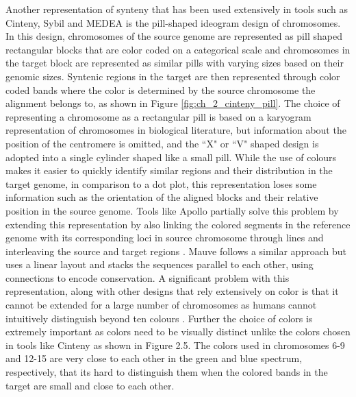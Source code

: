 Another representation of synteny that has been used extensively in tools such as Cinteny\cite{sinha2007cinteny}, Sybil\cite{crabtree2007sybil} and MEDEA\cite{nusrat2019tasks} is the pill-shaped ideogram design of chromosomes. In this design, chromosomes of the source genome are represented as pill shaped rectangular blocks that are color coded on a categorical scale and chromosomes in the target block are represented as similar pills with varying sizes based on their genomic sizes. Syntenic regions in the target are then represented through color coded bands where the color is determined by the source chromosome the alignment belongs to, as shown in Figure \ref{fig:ch_2_cinteny_pill}.
The choice of representing a chromosome as a rectangular pill is based on a karyogram representation of chromosomes in biological literature, but information about the position of the centromere is omitted, and the ``X" or ``V" shaped design is adopted into a single cylinder shaped like a small pill. While the use of colours makes it easier to quickly identify similar regions and their distribution in the target genome, in comparison to a dot plot, this representation loses some information such as the orientation of the aligned blocks and their relative position in the source genome. Tools like Apollo partially solve this problem by extending this representation by also linking the colored segments in the reference genome with its corresponding loci in source chromosome through lines and interleaving the source and target regions \cite{lee2009apollo}. Mauve follows a similar approach but uses a linear layout and stacks the sequences parallel to each other, using connections to encode conservation\cite{darling2004mauve}. A significant problem with this representation, along with other designs that rely extensively on color is that it cannot be extended for a large number of chromosomes as humans cannot intuitively distinguish beyond ten colours \cite{tufte1990envisioning}. Further the choice of colors is extremely important as colors need to be visually distinct unlike the colors chosen in tools like Cinteny\cite{sinha2007cinteny} as shown in Figure 2.5. The colors used in chromosomes 6-9 and 12-15 are very close to each other in the green and blue spectrum, respectively, that its hard to distinguish them when the colored bands in the target are small and close to each other. 

